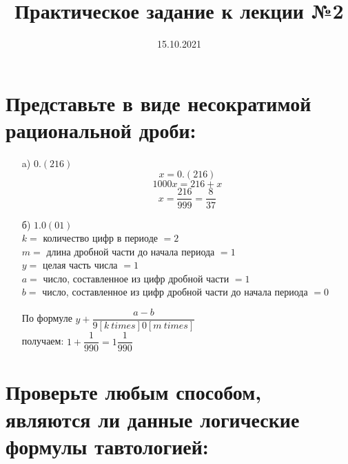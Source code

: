 \documentclass[10pt,a4paper]{article}
\title{Практическое задание к лекции №2}
\date{15.10.2021}
\begin{document}
\maketitle

\section{Представьте в виде несократимой рациональной дроби:}
\begin{enumerate}
\item[a)] $0.(216)$ \\[6pt]
$$x = 0.(216)$$
$$1000x = 216 + x$$
$$x=\frac{216}{999} = \boxed{\frac{8}{37}}$$

\item[б)] $1.0(01)$ \\[6pt]
$k=$ количество цифр в периоде $= 2$ \\
$m=$ длина дробной части до начала периода $= 1$ \\
$y=$ целая часть числа $= 1$ \\
$a=$ число, составленное из цифр дробной части $= 1$ \\
$b=$ число, составленное из цифр дробной части до начала периода $= 0$ \\[10pt]

\begin{center}
По формуле $y + \dfrac{a-b}{9[k \: times]0[m \: times]}$ \\[10pt]
получаем: $1 + \dfrac{1}{990}= \boxed{1\dfrac{1}{990}}$
\end{center}
\end{enumerate}

\section{Проверьте любым способом, являются ли данные логические формулы
тавтологией:}
\end{document}
